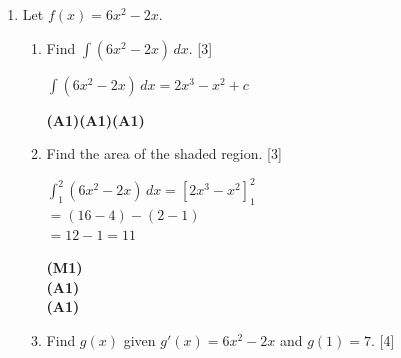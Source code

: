 \documentclass[12pt, twoside]{article}
\begin{document}
\begin{enumerate}[itemsep=0.2cm]
\begin{enumerate}[itemsep=0.3cm]
  \begin{minipage}[t]{0.62\textwidth}
  $3x^2 - 4 = 0 \Rightarrow x = \pm\dfrac{2}{\sqrt{3}}
    = \pm\dfrac{2\sqrt{3}}{3}$\\[0.3cm]
  $\left(-\dfrac{2\sqrt{3}}{3},\; 1 + \dfrac{16\sqrt{3}}{9}\right)$
  and
  $\left(\dfrac{2\sqrt{3}}{3},\; 1 - \dfrac{16\sqrt{3}}{9}\right)$
  \end{minipage}%
  \begin{minipage}[t]{0.35\textwidth}\raggedleft
  \textbf{(A1)}\\[0.8cm]
  \textbf{(A1)}
  \end{minipage}
\end{enumerate}

\bigskip

\item Let $f(x) = 6x^2 - 2x$.

\begin{enumerate}[itemsep=0.3cm]
  \item Find $\displaystyle\int (6x^2 - 2x)\,dx$. \hfill [3]

  \begin{minipage}[t]{0.62\textwidth}
  $\displaystyle\int (6x^2 - 2x)\,dx = 2x^3 - x^2 + c$
  \end{minipage}%
  \begin{minipage}[t]{0.35\textwidth}\raggedleft
  \textbf{(A1)(A1)(A1)}
  \end{minipage}

  \medskip
  \item Find the area of the shaded region. \hfill [3]

  \begin{minipage}[t]{0.62\textwidth}
  $\displaystyle\int_1^2 (6x^2 - 2x)\,dx
    = \left[2x^3 - x^2\right]_1^2$\\[0.2cm]
  $= (16 - 4) - (2 - 1)$\\[0.15cm]
  $= 12 - 1 = 11$
  \end{minipage}%
  \begin{minipage}[t]{0.35\textwidth}\raggedleft
  \textbf{(M1)}\\[0.2cm]
  \textbf{(A1)}\\[0.15cm]
  \textbf{(A1)}
  \end{minipage}

  \medskip
  \item Find $g(x)$ given $g'(x) = 6x^2 - 2x$ and $g(1) = 7$. \hfill [4]


\end{enumerate}
\end{enumerate}
\end{document}
